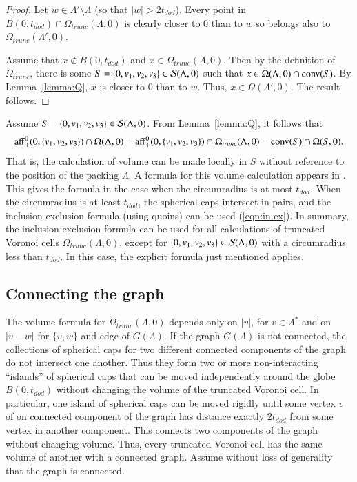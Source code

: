 \documentclass{article} %
\begin{document}
\begin{proof} Let $w\in \Lambda'\setminus\Lambda$ (so that  $|w|>2t_{dod}$).
Every point in $B(0,t_{dod})\cap \Omega_{trunc}(\Lambda,0)$ 
is clearly closer to $0$ than to $w$ so
belongs also to $\Omega_{trunc}(\Lambda',0)$.

Assume that $x\not\in B(0,t_{dod})$ and $x\in \Omega_{trunc}(\Lambda,0)$.
Then by the definition of $\Omega_{trunc}$,
there is some $S=\{0,v_1,v_2,v_3\}\in {\mathcal S}(\Lambda,0)$ such that
$x\in \Omega(\Lambda,0)\cap {\operatorname{conv}}(S)$.  By Lemma~\ref{lemma:Q},
$x$ is closer to $0$ than to $w$.  Thus, $x\in\Omega(\Lambda',0)$.
The result follows.
\end{proof}

Assume $S=\{0,v_1,v_2,v_3\}\in {\mathcal S}(\Lambda,0)$.
From Lemma~\ref{lemma:Q}, it follows that
\begin{equation}\label{eqn:omega-3}
{\operatorname{aff}}^0_+(0,\{v_1,v_2,v_3\}) \cap \Omega(\Lambda,0) = 
{\operatorname{aff}}^0_+(0,\{v_1,v_2,v_3\}) \cap \Omega_{trunc}(\Lambda,0) = 
{\operatorname{conv}}(S)\cap\Omega(S,0).
\end{equation}
That is, the calculation of volume can be made locally in $S$ without
reference to the position of the packing $\Lambda$.
A formula for this volume calculation appears in 
\cite[\S8.6.3]{Hales:1997:DCG}.  This gives the formula in the case
when the circumradius is at most $t_{dod}$.  When the circumradius
is at least $t_{dod}$, the spherical caps intersect in pairs,
and the inclusion-exclusion formula (using quoins)
can be used (\ref{eqn:in-ex}).
In summary, the inclusion-exclusion formula can be used for all
calculations of truncated Voronoi cells $\Omega_{trunc}(\Lambda,0)$,
except for $\{0,v_1,v_2,v_3\}\in {\mathcal S}(\Lambda,0)$ with
a circumradius less than $t_{dod}$.  In this case, 
the explicit formula just mentioned applies.

\subsection{Connecting the graph}

The volume formula for $\Omega_{trunc}(\Lambda,0)$ depends only on
$|v|$, for $v\in\Lambda^*$ and on $|v-w|$ for $\{v,w\}$ and edge of
$G(\Lambda)$. If the graph $G(\Lambda)$ is not connected, the
collections of spherical caps for two different connected components of
the graph do not intersect one another. Thus they form two or more
non-interacting ``islands'' of spherical caps that can be moved
independently around the globe $B(0,t_{dod})$ without changing the
volume of the truncated Voronoi cell. In particular, one island of
spherical caps can be moved rigidly until some vertex $v$ of on
connected component of the graph has distance exactly $2t_{dod}$ from
some vertex in another component. This connects two components of the
graph without changing volume. Thus, every truncated Voronoi cell has
the same volume of another with a connected graph. Assume without loss
of generality that the graph is connected.
\end{document}
